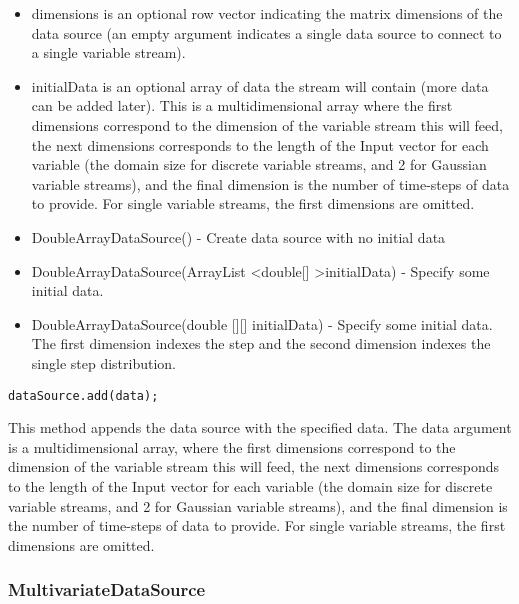 \begin{itemize}
\item dimensions is an optional row vector indicating the matrix dimensions of the data source (an empty argument indicates a single data source to connect to a single variable stream).
\item initialData is an optional array of data the stream will contain (more data can be added later).  This is a multidimensional array where the first dimensions correspond to the dimension of the variable stream this will feed, the next dimensions corresponds to the length of the Input vector for each variable (the domain size for discrete variable streams, and 2 for Gaussian variable streams), and the final dimension is the number of time-steps of data to provide.  For single variable streams, the first dimensions are omitted.
\end{itemize}
\fi

\ifjava
\begin{itemize}
\item DoubleArrayDataSource() - Create data source with no initial data
\item DoubleArrayDataSource(ArrayList \textless double[] \textgreater  initialData) - Specify some initial data. 
\item DoubleArrayDataSource(double [][] initialData) - Specify some initial data.  The first dimension indexes the step and the second dimension indexes the single step distribution.
\end{itemize}
\fi



\begin{lstlisting}
dataSource.add(data);
\end{lstlisting}

This method appends the data source with the specified data.  The data argument is a multidimensional array, where the first dimensions correspond to the dimension of the variable stream this will feed, the next dimensions corresponds to the length of the Input vector for each variable (the domain size for discrete variable streams, and 2 for Gaussian variable streams), and the final dimension is the number of time-steps of data to provide.  For single variable streams, the first dimensions are omitted.

\subsubsection{MultivariateDataSource}


